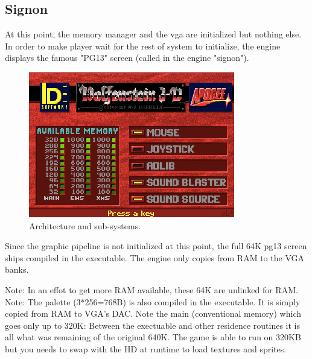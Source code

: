 \documentclass[book.tex]{subfiles}
\begin{document}
\subsection{Signon}
At this point, the memory manager and the vga are initialized but nothing else. In order to make player wait for the rest of system to initialize, the engine displays the famous "PG13" screen (called in the engine "signon").
\begin{figure}[H]
\centering
\includegraphics[width=\textwidth]{imgs/signon.png}
\caption{Architecture and sub-systems.}
\end{figure}
Since the graphic pipeline is not initialized at this point, the full 64K pg13 screen ships compiled in the executable. The engine only copies from RAM to the VGA banks.\\
\par 
\begin{minipage}{\textwidth}

\end{minipage}
Note: In an effot to get more RAM available, these 64K are unlinked for RAM.\\
Note: The palette (3*256=768B) is also compiled in the executable. It is simply copied from RAM to VGA's DAC.
Note the main (conventional memory) which goes only up to 320K: Between the exectuable and other residence routines it is all what was remaining of the original 640K. The game is able to run on 320KB but you needs to swap with the HD at runtime to load textures and sprites.
\end{document}
